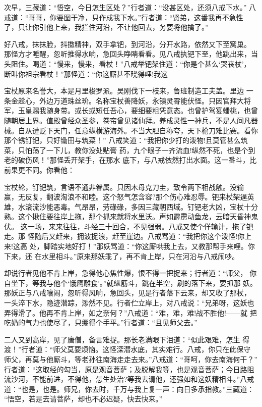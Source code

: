 次早，三藏道：“悟空，今日怎生区处？”行者道：“没甚区处，还须八戒下水。”
八戒道：“哥哥，你要图干净，只作成我下水。”行者道：“贤弟，这番我再不急性
了，只让你引他上来，我拦住河沿，不让他回去，务要将他擒了。”

好八戒，抹抹脸，抖擞精神，双手拿钯，到河沿，分开水路，依然又下至窝巢。
那怪方才睡醒，忽听推得水响，急回头睁睛看看。见八戒执钯下至，他跳出来，当
头阻住。喝道：“慢来，慢来，看杖！”八戒举钯架住道：“你是个甚么‘哭丧杖’，
断叫你祖宗看杖！”那怪道：“你这厮甚不晓得哩!我这

宝杖原来名誉大，本是月里梭罗派。吴刚伐下一枝来，鲁班制造工夫盖。里边
一条金趁心，外边万道珠丝玠。名称宝杖善降妖，永镇灵霄能伏怪。只因官拜大将
军，玉皇赐我随身带。或长或短任吾心，要细要粗凭意态。也曾护驾宴蟠桃，也曾
随朝居上界。值殿曾经众圣参，卷帘曾见诸仙拜。养成灵性一神兵，不是人间凡器
械。自从遭贬下天门，任意纵横游海外。不当大胆自称夸，天下枪刀难比赛。看你
那个锈钉钯，只好锄田与筑菜！”
八戒笑道：“我把你少打的泼物!且莫管甚么筑菜，只怕荡了一下儿，教你没处贴膏
药，九个眼子一齐流血!纵然不死，也是个到老的破伤风！”那怪丢开架手，在那水
底下，与八戒依然打出水面。这一番斗，比前果更不同。你看他：

宝杖轮，钉钯筑，言语不通非眷属。只因木母克刀圭，致令两下相战触。没输
赢，无反复，翻波淘浪不和睦。这个怒气怎含容?那个伤心难忍辱。钯来杖架逞英
雄，水滚流沙能恶毒。气昂昂，劳碌碌，多因三藏朝西域。钉钯老大凶，宝杖十分
熟。这个揪住要往岸上拖，那个抓来就将水里沃。声如霹雳动鱼龙，云暗天昏神鬼
伏。
这一场，来来往往，斗经三十回合，不见强弱。八戒又使个佯输计，拖了钯走。那
怪随后又赶来，拥波捉浪，赶至崖边。八戒骂道：“我把你这个泼怪!你上来!这高
处，脚踏实地好打！”那妖骂道：“你这厮哄我上去，又教那帮手来哩。你下来，还
在水里相斗。”原来那妖乖了，再不肯上岸，只在河沿与八戒闹吵。

却说行者见他不肯上岸，急得他心焦性爆，恨不得一把捉来；行者道：“师父，
你自坐下，等我与他个‘饿鹰雕食’。”就纵筋斗，跳在半空，刷的落下来，要抓那
妖。那妖正与八戒嚷闹，忽听得风响，急回头，见是行者落下云来，却又收了那杖，
一头淬下水，隐迹潜踪，渺然不见。行者伫立岸上，对八戒说：“兄弟呀，这妖也
弄得滑了。他再不肯上岸，如之奈何？”八戒道：“难，难，难!战不胜他!——就
把吃奶的气力也使尽了，只绷得个手平。”行者道：“且见师父去。”

二人又到高岸，见了唐僧，备言难捉。那长老满眼下泪道：“似此艰难，怎生
得渡！”行者道：“师父莫要烦恼。这怪深潜水底，其实难行。八戒，你只在此保守
师父，再莫与他厮斗，等老孙往南海走走去来。”八戒道：“哥呵，你去南海何干？”
行者道：“这取经的勾当，原是观音菩萨；及脱解我等，也是观音菩萨；今日路阻
流沙河，不能前进，不得他，怎生处治?等我去请他，还强如和这妖精相斗。”八戒
道：“也是，也是。师兄，你去时，千万与我上复一声：向日多承指教。”三藏道：
“悟空，若是去请菩萨，却也不必迟疑，快去快来。”

